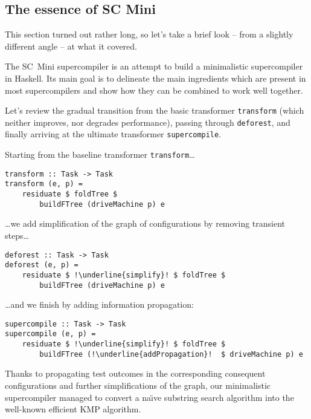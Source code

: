 \subsection{The essence of SC Mini}

This section turned out rather long, so let's take a brief look -- from 
a slightly different angle -- at what it covered.

The SC~Mini supercompiler is an attempt to build a minimalistic supercompiler in Haskell.
Its main goal is to delineate the main ingredients which are present in most supercompilers
and show how they can be combined to work well together.

Let's review the gradual transition from the basic transformer \texttt{transform}
(which neither improves, nor degrades performance), passing through \texttt{deforest},
and finally arriving at the ultimate transformer \texttt{supercompile}.

\noindent Starting from the baseline transformer \texttt{transform}\ldots
\begin{lstlisting}[escapechar=!]
transform :: Task -> Task
transform (e, p) =
	residuate $ foldTree $
		buildFTree (driveMachine p) e
\end{lstlisting}
\ldots we add simplification of the graph of configurations by removing transient steps\ldots
\begin{lstlisting}[escapechar=!]
deforest :: Task -> Task
deforest (e, p) =
	residuate $ !\underline{simplify}! $ foldTree $
    	buildFTree (driveMachine p) e
\end{lstlisting}
\ldots and we finish by adding information propagation:
\begin{lstlisting}[escapechar=!]
supercompile :: Task -> Task
supercompile (e, p) =
	residuate $ !\underline{simplify}! $ foldTree $
		buildFTree (!\underline{addPropagation}!  $ driveMachine p) e
\end{lstlisting}

Thanks to propagating test outcomes in the corresponding consequent configurations
and further simplifications of the graph, our minimalistic supercompiler
managed to convert a na\"{\i}ve substring search algorithm into the well-known
efficient KMP algorithm.

